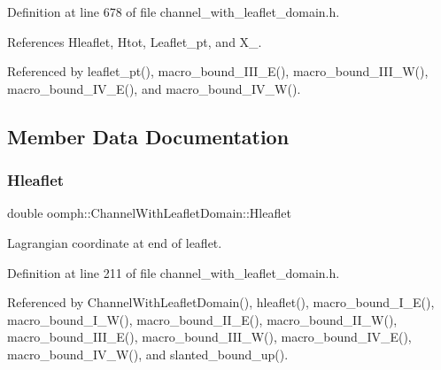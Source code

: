 Definition at line 678 of file channel\+\_\+with\+\_\+leaflet\+\_\+domain.\+h.



References Hleaflet, Htot, Leaflet\+\_\+pt, and X\+\_.



Referenced by leaflet\+\_\+pt(), macro\+\_\+bound\+\_\+\+I\+I\+I\+\_\+\+E(), macro\+\_\+bound\+\_\+\+I\+I\+I\+\_\+\+W(), macro\+\_\+bound\+\_\+\+I\+V\+\_\+\+E(), and macro\+\_\+bound\+\_\+\+I\+V\+\_\+\+W().



\subsection{Member Data Documentation}
\mbox{\label{classoomph_1_1ChannelWithLeafletDomain_a75ce3248efae5c33a9c9989b2f310139}} 
\subsubsection{\texorpdfstring{Hleaflet}{Hleaflet}}
{\footnotesize\ttfamily double oomph\+::\+Channel\+With\+Leaflet\+Domain\+::\+Hleaflet\hspace{0.3cm}{\ttfamily [protected]}}



Lagrangian coordinate at end of leaflet. 



Definition at line 211 of file channel\+\_\+with\+\_\+leaflet\+\_\+domain.\+h.



Referenced by Channel\+With\+Leaflet\+Domain(), hleaflet(), macro\+\_\+bound\+\_\+\+I\+\_\+\+E(), macro\+\_\+bound\+\_\+\+I\+\_\+\+W(), macro\+\_\+bound\+\_\+\+I\+I\+\_\+\+E(), macro\+\_\+bound\+\_\+\+I\+I\+\_\+\+W(), macro\+\_\+bound\+\_\+\+I\+I\+I\+\_\+\+E(), macro\+\_\+bound\+\_\+\+I\+I\+I\+\_\+\+W(), macro\+\_\+bound\+\_\+\+I\+V\+\_\+\+E(), macro\+\_\+bound\+\_\+\+I\+V\+\_\+\+W(), and slanted\+\_\+bound\+\_\+up().

\mbox{\label{classoomph_1_1ChannelWithLeafletDomain_ad32b0daa71b42d34aec81c7e3d25cb98}} 
